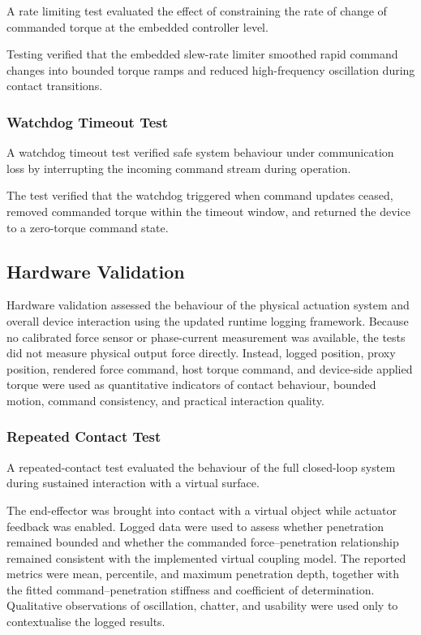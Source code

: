A rate limiting test evaluated the effect of constraining the rate of change of commanded torque at the embedded controller level.

Testing verified that the embedded slew-rate limiter smoothed rapid command changes into bounded torque ramps and reduced high-frequency oscillation during contact transitions.

\subsubsection{Watchdog Timeout Test}

A watchdog timeout test verified safe system behaviour under communication loss by interrupting the incoming command stream during operation.

The test verified that the watchdog triggered when command updates ceased, removed commanded torque within the timeout window, and returned the device to a zero-torque command state.

\subsection{Hardware Validation} \label{sec:method_hardware_validation}

Hardware validation assessed the behaviour of the physical actuation system and overall device interaction using the updated runtime logging framework. Because no calibrated force sensor or phase-current measurement was available, the tests did not measure physical output force directly. Instead, logged position, proxy position, rendered force command, host torque command, and device-side applied torque were used as quantitative indicators of contact behaviour, bounded motion, command consistency, and practical interaction quality.

\subsubsection{Repeated Contact Test} \label{sec:method_stable_contact_hardware}

A repeated-contact test evaluated the behaviour of the full closed-loop system during sustained interaction with a virtual surface.

The end-effector was brought into contact with a virtual object while actuator feedback was enabled. Logged data were used to assess whether penetration remained bounded and whether the commanded force--penetration relationship remained consistent with the implemented virtual coupling model. The reported metrics were mean, percentile, and maximum penetration depth, together with the fitted command--penetration stiffness and coefficient of determination. Qualitative observations of oscillation, chatter, and usability were used only to contextualise the logged results.

